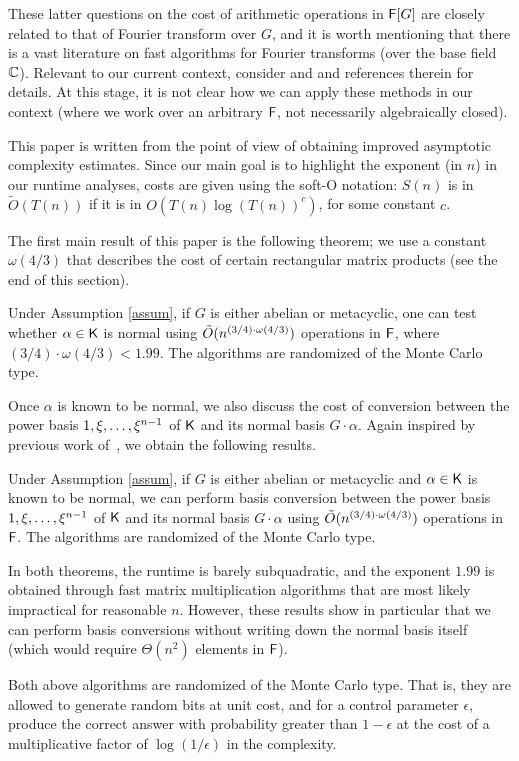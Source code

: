 These latter questions on the cost of arithmetic operations in ${\mathsf{F}}[G]$
are closely related to that of Fourier transform over $G$, and it is
worth mentioning that there is a vast literature on fast algorithms
for Fourier transforms (over the base field $\mathbb{C}$). Relevant to our
current context, consider \citep{ClaMu04} and \citep{MaRockWol18} and
references therein for details. At this stage, it is not clear how we
can apply these methods in our context (where we work over an
arbitrary ${\mathsf{F}}$, not necessarily algebraically closed).

This paper is written from the point of view of obtaining improved
asymptotic complexity estimates. Since our main goal is to highlight
the exponent (in $n$) in our runtime analyses, costs are given using
the soft-O notation: $S(n)$ is in $\tilde{O}(T(n))$ if it is in
$O(T(n) \log(T(n))^c)$, for some constant $c$.

The first main result of this paper is the following theorem; we use a
constant $\omega(4/3)$ that describes the cost of certain rectangular
matrix products (see the end of this section).
\begin{theorem}\label{thm:main}
  Under Assumption \ref{assum}, if $G$ is either abelian or
  metacyclic, one can test whether $\alpha \in {\mathsf{K}}$ is normal using
  $\tilde{O}(n^{(3/4)\cdot \omega(4/3)})$ operations in ${\mathsf{F}}$, where
  $(3/4)\cdot\omega(4/3)<1.99$. The algorithms are randomized of the Monte Carlo type.
\end{theorem}
Once $\alpha$ is known to be normal, we also discuss the cost 
of conversion between the power basis $1,\xi,\dots,\xi^{n-1}$
of ${\mathsf{K}}$ and its normal basis $G\cdot \alpha$. Again inspired by
previous work of~\cite{KalSho98}, we obtain the following results.
\begin{theorem}\label{thm:main2}
  Under Assumption \ref{assum}, if $G$ is either abelian or metacyclic
  and $\alpha \in {\mathsf{K}}$ is known to be normal, we can perform basis
  conversion between the power basis $1,\xi,\dots,\xi^{n-1}$ of
  ${\mathsf{K}}$ and its normal basis $G\cdot \alpha$ using $\tilde{O}(n^{(3/4)\cdot \omega(4/3)})$
  operations in ${\mathsf{F}}$. The algorithms are randomized of the Monte Carlo type.
\end{theorem}
In both theorems, the runtime is barely subquadratic, and the exponent
$1.99$ is obtained through fast matrix multiplication algorithms that
are most likely impractical for reasonable $n$. However, these results
show in particular that we can perform basis conversions without
writing down the normal basis itself (which would require
$\Theta(n^2)$ elements in ${\mathsf{F}}$).
\begin{remark}
Both above algorithms are randomized of the Monte Carlo type.  That is, they are allowed to generate random bits at unit cost, and for a control parameter $\epsilon$, produce the correct answer with probability greater than $1-\epsilon$ at the cost of a multiplicative factor of $\log(1/\epsilon)$ in the complexity.
\end{remark}

